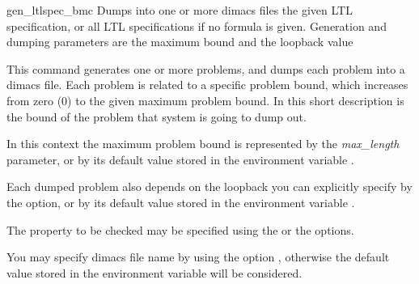 \begin{nusmvCommand} {gen\_ltlspec\_bmc} {Dumps into one or more dimacs files the given LTL specification, or all LTL specifications if no formula is given. Generation and dumping parameters are the maximum bound and the loopback value}


This command generates one or more problems, and  dumps each problem
into a dimacs file. Each problem is related to a specific problem
bound, which increases from zero (0) to the given maximum problem
bound. In this short description  is the bound of the
problem that system is going to dump out. 

In this context the maximum problem bound is represented by the {\it
max\_length} parameter, or by its default value stored in the
environment variable .

Each dumped problem also depends on the loopback you can explicitly
specify by the  option, or by its default value stored
in the environment variable .

The property to be checked may be specified using the  or the  options.

You may specify dimacs file name by using the option , otherwise the default value stored in the environment
variable  will be considered.

\begin{cmdOpt}

            
       

\end{cmdOpt}
\end{nusmvCommand}

